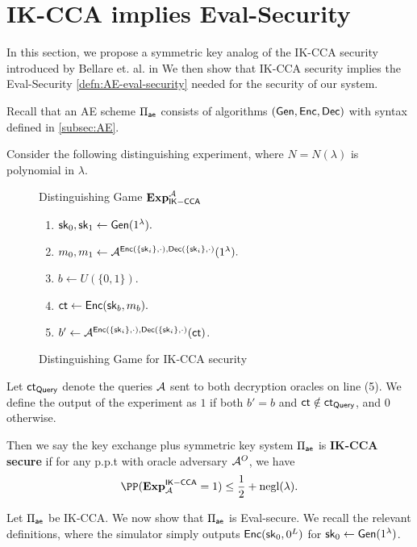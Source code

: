 \section{IK-CCA implies Eval-Security}
\label{sec:IND-CCPKA}
In this section, we propose a symmetric key analog of the IK-CCA security introduced by Bellare et. al. in \cite[Definition 1]{BBDP01keyprivate}
We then show that IK-CCA security implies the Eval-Security \cref{defn:AE-eval-security} needed for the security of our system.

Recall that an AE scheme $\Pi_{\mathsf{ae}}$ consists of algorithms $(\mathsf{Gen}, \mathsf{Enc}, \mathsf{Dec})$ with syntax defined in \cref{subsec:AE}. 

\begin{definition}[IK-CCA]
\label{defn:AE-IK-CCA}
Consider the following distinguishing experiment, where $N = N(\lambda)$ is polynomial in $\lambda$.
\begin{figure}[ht!]
\begin{framed}
Distinguishing Game $\mathbf{Exp}_{\mathsf{IK-CCA}}^{\mathcal{A}}$
\begin{enumerate}
    \item ${\mathsf{sk}}_0, {\mathsf{sk}}_1 \leftarrow \mathsf{Gen}(1^{\lambda}).$
    \item $m_0, m_1 \leftarrow \mathcal{A}^{\mathsf{Enc}(\{{\mathsf{sk}}_{i}\}, \cdot), \mathsf{Dec}(\{{\mathsf{sk}}_{i}\}, \cdot)}(1^{\lambda}).$
    \item $b \leftarrow U(\{0, 1\})$.
    \item $\mathsf{ct} \leftarrow \mathsf{Enc}({\mathsf{sk}}_b, m_b).$
    \item $b' \leftarrow \mathcal{A}^{\mathsf{Enc}(\{{\mathsf{sk}}_{i}\}, \cdot), \mathsf{Dec}(\{{\mathsf{sk}}_{i}\}, \cdot)}(\mathsf{ct})$.
\end{enumerate}
\end{framed}
\caption{Distinguishing Game for IK-CCA security}
\label{expr:AE-IKCCA-Distinguish}
\end{figure}

Let $\mathsf{ct}_{\mathsf{Query}}$ denote the queries $\mathcal{A}$ sent to both decryption oracles on line (5).  We define the output of the experiment as $1$ if both $b' = b$ and $\mathsf{ct} \notin \mathsf{ct}_{\mathsf{Query}}$, and $0$ otherwise. 

Then we say the key exchange plus symmetric key system $\Pi_{\mathsf{ae}}$ is \textbf{IK-CCA secure} if for any p.p.t with oracle adversary $\mathcal{A}^O$, we have
$$\PP(\mathbf{Exp}^{\mathsf{IK-CCA}}_{\cA} = 1) \leq \frac{1}{2} + \negl(\lambda).$$
\end{definition}

Let $\Pi_{\mathsf{ae}}$ be IK-CCA. We now show that $\Pi_{\mathsf{ae}}$ is Eval-secure. We recall the relevant definitions, where the simulator simply outputs $\mathsf{Enc}({\mathsf{sk}}_{0}, 0^{L})$ for ${\mathsf{sk}}_0 \leftarrow \mathsf{Gen}(1^{\lambda})$.

